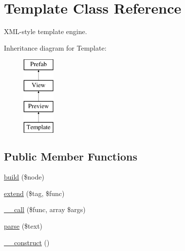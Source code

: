 \hypertarget{class_template}{}\section{Template Class Reference}
\label{class_template}


X\+M\+L-\/style template engine.  


Inheritance diagram for Template\+:\begin{figure}[H]
\begin{center}
\leavevmode
\includegraphics[height=4.000000cm]{class_template}
\end{center}
\end{figure}
\subsection*{Public Member Functions}
\begin{DoxyCompactItemize}
\item 
\hyperlink{class_template_a0e9d773ad8306b0d66337606414a443d}{build} (\$node)
\item 
\hyperlink{class_template_a441602e9d8e2305bee53a34a10b9fa64}{extend} (\$tag, \$func)
\item 
\hyperlink{class_template_a975d2c46a134129eb727fadcadf48adf}{\+\_\+\+\_\+call} (\$func, array \$args)
\item 
\hyperlink{class_template_aad1c85bef0735e4888d8f8e26652f9f7}{parse} (\$text)
\item 
\hyperlink{class_template_a095c5d389db211932136b53f25f39685}{\+\_\+\+\_\+construct} ()
\end{DoxyCompactItemize}
